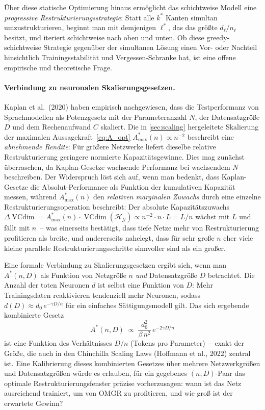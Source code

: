 \documentclass[12pt, a4paper, openany]{report}
\newcommand{\calG}{\mathcal{G}}
\newcommand{\calH}{\mathcal{H}}
\DeclareMathOperator{\VC}{VCdim}
\begin{document}
Über diese statische Optimierung hinaus ermöglicht das schichtweise Modell
eine \emph{progressive Restrukturierungsstrategie}: Statt alle $k^*$ Kanten
simultan umzustrukturieren, beginnt man mit demjenigen $\ell^*$, das das
größte $d_{\ell} / n_{\ell}$ besitzt, und iteriert schichtweise nach oben
und unten.  Ob diese greedy-schichtweise Strategie gegenüber der simultanen
Lösung einen Vor- oder Nachteil hinsichtlich Trainings\-stabilität und
Vergessen-Schranke hat, ist eine offene empirische und theoretische Frage.

\paragraph{Verbindung zu neuronalen Skalierungsgesetzen.}
Kaplan et al.\ (2020) haben empirisch nachgewiesen, dass die Testperformanz
von Sprachmodellen als Potenzgesetz mit der Parameteranzahl $N$, der
Datensatzgröße $D$ und dem Rechenaufwand $C$ skaliert.  Die in \cref{sec:scaling}
hergeleitete Skalierung der maximalen Aussagekraft~\eqref{eq:A_opt}
$A^*_{\max}(n) \propto n^{-2}$ beschreibt eine \emph{abnehmende Rendite}:
Für größere Netzwerke liefert dieselbe relative Restrukturierung geringere
normierte Kapazitätsgewinne.  Dies mag zunächst überraschen, da Kaplan-Gesetze
wachsende Performanz bei wachsendem $N$ beschreiben.  Der Widerspruch löst
sich auf, wenn man bedenkt, dass Kaplan-Gesetze die Absolut-Performance als
Funktion der kumulativen Kapazität messen, während $A^*_{\max}(n)$ den
\emph{relativen marginalen Zuwachs} durch eine einzelne Restrukturierungsoperation
beschreibt: Der absolute Kapazitätszuwachs
$\Delta\VC = A^*_{\max}(n) \cdot \VC(\calH_{\calG}) \propto n^{-2} \cdot n \cdot L = L/n$
wächst mit $L$ und fällt mit $n$~-- was einerseits bestätigt, dass tiefe
Netze mehr von Restrukturierung profitieren als breite, und andererseits
nahelegt, dass für sehr große $n$ eher viele kleine parallele
Restrukturierungsschritte sinnvoller sind als ein großer.

Eine formale Verbindung zu Skalierungsgesetzen ergibt sich, wenn man
$A^*(n, D)$ als Funktion von Netzgröße $n$ \emph{und} Datensatzgröße $D$
betrachtet.  Die Anzahl der toten Neuronen $d$ ist selbst eine Funktion von
$D$: Mehr Trainingsdaten reaktivieren tendenziell mehr Neuronen, sodass
$d(D) \approx d_0\,e^{-\gamma D/n}$ für ein einfaches Sättigungsmodell gilt.
Das sich ergebende kombinierte Gesetz
\[
  A^*(n, D) \;\propto\; \frac{d_0^2}{\beta\,n^2}\,e^{-2\gamma D/n}
\]
ist eine Funktion des Verhältnisses $D/n$ (Tokens pro Parameter)~-- exakt
der Größe, die auch in den Chinchilla Scaling Laws (Hoffmann et al., 2022)
zentral ist.  Eine Kalibrierung dieses kombinierten Gesetzes über mehrere
Netzwerkgrößen und Datensatzgrößen würde es erlauben, für ein gegebenes
$(n, D)$-Paar das optimale Restrukturierungsfenster präzise vorherzusagen:
wann ist das Netz ausreichend trainiert, um von OMGR zu profitieren, und
wie groß ist der erwartete Gewinn?
\end{document}
